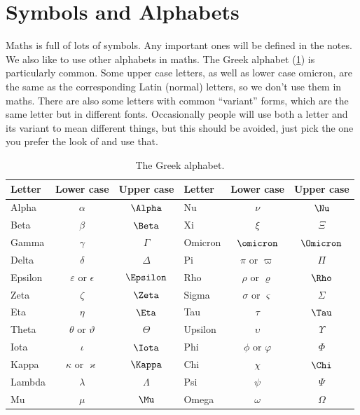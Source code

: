 \documentclass[fleqn]{LectureClass/LectureClass}
\begin{document}
    \section{Symbols and Alphabets}
    Maths is full of lots of symbols.
    Any important ones will be defined in the notes.
    We also like to use other alphabets in maths.
    The Greek alphabet (\cref{tab:greek alphabet}) is particularly common.
    Some upper case letters, as well as lower case omicron, are the same as the corresponding Latin (normal) letters, so we don't use them in maths.
    There are also some letters with common \enquote{variant} forms, which are the same letter but in different fonts.
    Occasionally people will use both a letter and its variant to mean different things, but this should be avoided, just pick the one you prefer the look of and use that.
    
    \begin{table}
        \caption[The Greek alphabet.]{The Greek alphabet.}
        \label{tab:greek alphabet}
        \begin{tabular}{lcclcc}
            \toprule
            Letter & Lower case & Upper case & Letter & Lower case & Upper case\\
            \midrule
            Alpha & \(\alpha\) & \(\Alpha\) & Nu & \(\nu\) & \(\Nu\)\\
            Beta & \(\beta\) & \(\Beta\) & Xi & \(\xi\) & \(\Xi\)\\
            Gamma & \(\gamma\) & \(\Gamma\) & Omicron & \(\omicron\) & \(\Omicron\)\\
            Delta & \(\delta\) & \(\Delta\) & Pi & \(\pi\) or \(\varpi\) & \(\Pi\)\\
            Epsilon & \(\varepsilon\) or \(\epsilon\) & \(\Epsilon\) & Rho & \(\rho\) or \(\varrho\) & \(\Rho\)\\
            Zeta & \(\zeta\) & \(\Zeta\) & Sigma & \(\sigma\) or \(\varsigma\) & \(\Sigma\)\\
            Eta & \(\eta\) & \(\Eta\) & Tau & \(\tau\) & \(\Tau\)\\
            Theta & \(\theta\) or \(\vartheta\) & \(\Theta\) & Upsilon & \(\upsilon\) & \(\Upsilon\)\\
            Iota & \(\iota\) & \(\Iota\) & Phi & \(\phi\) or \(\varphi\) & \(\Phi\)\\
            Kappa & \(\kappa\) or \(\varkappa\) & \(\Kappa\) & Chi & \(\chi\) & \(\Chi\)\\
            Lambda & \(\lambda\) & \(\Lambda\) & Psi & \(\psi\) & \(\Psi\)\\
            Mu & \(\mu\) & \(\Mu\) & Omega & \(\omega\) & \(\Omega\)\\
            \bottomrule
        \end{tabular}
    \end{table}
    
\end{document}
